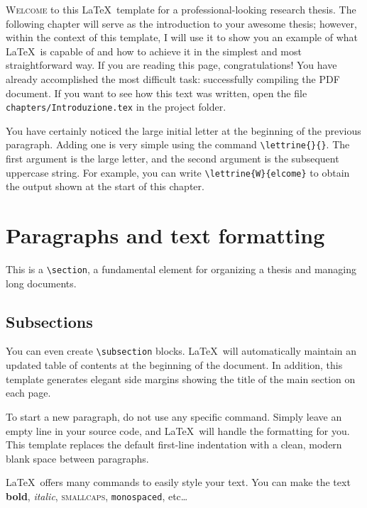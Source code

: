 \lettrine{W}{elcome} to this \LaTeX\ template for a professional-looking research thesis. The following chapter will serve as the introduction to your awesome thesis; however, within the context of this template, I will use it to show you an example of what \LaTeX\ is capable of and how to achieve it in the simplest and most straightforward way. If you are reading this page, congratulations! You have already accomplished the most difficult task: successfully compiling the PDF document. If you want to see how this text was written, open the file \Verb|chapters/Introduzione.tex| in the project folder.

You have certainly noticed the large initial letter at the beginning of the previous paragraph. Adding one is very simple using the command \Verb|\lettrine{}{}|. The first argument is the large letter, and the second argument is the subsequent uppercase string. For example, you can write \Verb|\lettrine{W}{elcome}| to obtain the output shown at the start of this chapter.

\section{Paragraphs and text formatting}

This is a \Verb|\section|, a fundamental element for organizing a thesis and managing long documents.

\subsection{Subsections}

You can even create \Verb|\subsection| blocks. \LaTeX\ will automatically maintain an updated table of contents at the beginning of the document. In addition, this template generates elegant side margins showing the title of the main section on each page.

To start a new paragraph, do not use any specific command. Simply leave an empty line in your source code, and \LaTeX\ will handle the formatting for you. This template replaces the default first-line indentation with a clean, modern blank space between paragraphs.

\LaTeX\ offers many commands to easily style your text. You can make the text \textbf{bold}, \textit{italic}, \textsc{smallcaps}, \texttt{monospaced}, etc\dots

